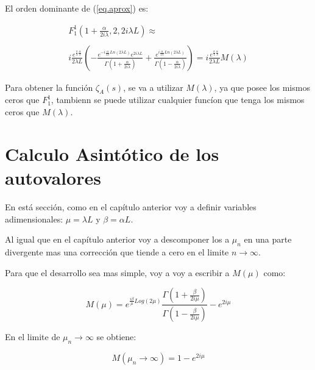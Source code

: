 El orden dominante de (\ref{eq.aprox}) es:

\begin{equation}
\begin{array}{c}
    F _1 ^1 (1+  \frac{  \alpha}{2 i \lambda} ,2 ,2 i \lambda L  ) \approx \\ \\
   i  \frac{e ^{ \frac{\pi}{4} \frac{\alpha}{\lambda} } }{2 \lambda L}
    \left( -
    \frac{e ^{- i \frac{\alpha}{2 \lambda} Ln(2 \lambda L) } e ^{2 i \lambda L} }{\Gamma(1+\frac{ \alpha}{2 i \lambda})} +
    \frac{e ^{  i \frac{\alpha}{2 \lambda} Ln(2 \lambda L) }}               {\Gamma(1-\frac{ \alpha}{2 i \lambda})}
    \right) = 
    i  \frac{e ^{ \frac{\pi}{4} \frac{\alpha}{\lambda} } }{2 \lambda L}     M (\lambda) 
\end{array}
\label{eq.completa}
\end{equation}

Para obtener la función $\zeta _A (s) $, se va a utilizar $M( \lambda)$, ya que posee los mismos ceros que $F _1 ^1$, tambienn se puede utilizar cualquier funcíon que tenga los mismos ceros que $M ( \lambda )$.





\section{Calculo Asintótico de los autovalores}


En está sección, como en el capítulo anterior voy a definir variables adimensionales: $\mu = \lambda L $ y $\beta = \alpha L$.

Al igual que en el capítulo anterior voy a descomponer los a $\mu _n$ en una parte divergente mas una corrección que tiende a cero en el limite $n \rightarrow \infty$.

Para que el desarrollo sea mas simple, voy a voy a escribir a $M (\mu)$ como:

\begin{equation}
M (\mu) = e ^{\frac{i \beta }{\mu} Log(2 \mu) }
\frac{\Gamma (1 + \frac{ \beta}{2 i \mu})}{\Gamma (1 - \frac{ \beta}{2 i \mu})}
- e ^{2 i \mu}
\label{eq.otro.mu}
\end{equation}


En el limite de $\mu _n \rightarrow \infty$ se obtiene:

\begin{equation}
    M(\mu _n \rightarrow \infty) = 
	1 - e ^{2 i \mu}
\end{equation}

